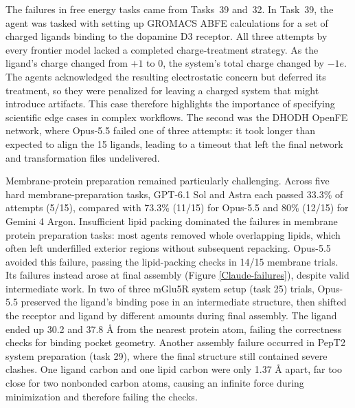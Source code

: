 The failures in free energy tasks came from Tasks~39 and~32. In Task~39, the agent was tasked with setting up GROMACS ABFE calculations for a set of charged ligands binding to the dopamine D3 receptor. All three attempts by every frontier model lacked a completed charge-treatment strategy. As the ligand's charge changed from $+1$ to $0$, the system's total charge changed by $-1e$. The agents acknowledged the resulting electrostatic concern but deferred its treatment, so they were penalized for leaving a charged system that might introduce artifacts. This case therefore highlights the importance of specifying scientific edge cases in complex workflows. The second was the DHODH OpenFE network, where Opus-5.5 failed one of three attempts: it took longer than expected to align the 15 ligands, leading to a timeout that left the final network and transformation files undelivered.

Membrane-protein preparation remained particularly challenging. Across five hard membrane-preparation tasks, GPT-6.1 Sol and Astra each passed 33.3\% of attempts (5/15), compared with 73.3\% (11/15) for Opus-5.5 and 80\% (12/15) for Gemini 4 Argon. Insufficient lipid packing dominated the failures in membrane protein preparation tasks: most agents removed whole overlapping lipids, which often left underfilled exterior regions without subsequent repacking. Opus-5.5 avoided this failure, passing the lipid-packing checks in 14/15 membrane trials. Its failures instead arose at final assembly (Figure \ref{Claude-failures}), despite valid intermediate work. In two of three mGlu5R system setup (task 25) trials, Opus-5.5 preserved the ligand’s binding pose in an intermediate structure, then shifted the receptor and ligand by different amounts during final assembly. The ligand ended up 30.2 and 37.8 Å from the nearest protein atom, failing the correctness checks for binding pocket geometry. Another assembly failure occurred in PepT2 system preparation (task 29), where the final structure still contained severe clashes. One ligand carbon and one lipid carbon were only 1.37 Å apart, far too close for two nonbonded carbon atoms, causing an infinite force during minimization and therefore failing the checks.




